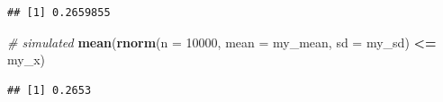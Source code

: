 \documentclass[]{book}
\newenvironment{Shaded}{\begin{snugshade}}{\end{snugshade}}
\newcommand{\CommentTok}[1]{\textcolor[rgb]{0.56,0.35,0.01}{\textit{#1}}}
\newcommand{\DataTypeTok}[1]{\textcolor[rgb]{0.13,0.29,0.53}{#1}}
\newcommand{\DecValTok}[1]{\textcolor[rgb]{0.00,0.00,0.81}{#1}}
\newcommand{\KeywordTok}[1]{\textcolor[rgb]{0.13,0.29,0.53}{\textbf{#1}}}
\newcommand{\NormalTok}[1]{#1}
\newcommand{\OperatorTok}[1]{\textcolor[rgb]{0.81,0.36,0.00}{\textbf{#1}}}
\newcommand{\StringTok}[1]{\textcolor[rgb]{0.31,0.60,0.02}{#1}}
\begin{document}
\begin{verbatim}
## [1] 0.2659855
\end{verbatim}

\begin{Shaded}
\begin{Highlighting}[]
\CommentTok{# simulated}
\KeywordTok{mean}\NormalTok{(}\KeywordTok{rnorm}\NormalTok{(}\DataTypeTok{n =} \DecValTok{10000}\NormalTok{, }\DataTypeTok{mean =}\NormalTok{ my_mean, }\DataTypeTok{sd =}\NormalTok{ my_sd) }\OperatorTok{<=}\StringTok{ }\NormalTok{my_x)}
\end{Highlighting}
\end{Shaded}

\begin{verbatim}
## [1] 0.2653
\end{verbatim}
\end{document}
